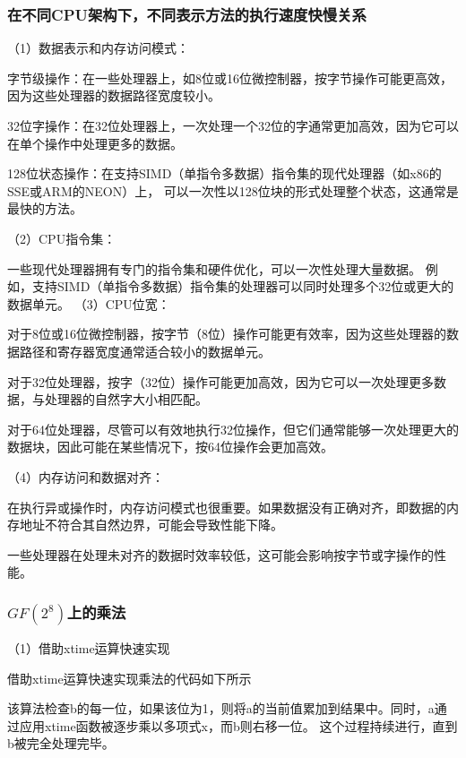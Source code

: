 \documentclass[a4paper,11pt,UTF8]{ctexart}
\begin{document}
        \subsubsection{在不同CPU架构下，不同表示方法的执行速度快慢关系}
            （1）数据表示和内存访问模式：\par
                字节级操作：在一些处理器上，如8位或16位微控制器，按字节操作可能更高效，因为这些处理器的数据路径宽度较小。\par
                32位字操作：在32位处理器上，一次处理一个32位的字通常更加高效，因为它可以在单个操作中处理更多的数据。\par
                128位状态操作：在支持SIMD（单指令多数据）指令集的现代处理器（如x86的SSE或ARM的NEON）上，
                可以一次性以128位块的形式处理整个状态，这通常是最快的方法。\par
            （2）CPU指令集：\par
                一些现代处理器拥有专门的指令集和硬件优化，可以一次性处理大量数据。
                例如，支持SIMD（单指令多数据）指令集的处理器可以同时处理多个32位或更大的数据单元。
            （3）CPU位宽：\par
                对于8位或16位微控制器，按字节（8位）操作可能更有效率，因为这些处理器的数据路径和寄存器宽度通常适合较小的数据单元。\par
                对于32位处理器，按字（32位）操作可能更加高效，因为它可以一次处理更多数据，与处理器的自然字大小相匹配。\par
                对于64位处理器，尽管可以有效地执行32位操作，但它们通常能够一次处理更大的数据块，因此可能在某些情况下，按64位操作会更加高效。\par
            （4）内存访问和数据对齐：\par
                在执行异或操作时，内存访问模式也很重要。如果数据没有正确对齐，即数据的内存地址不符合其自然边界，可能会导致性能下降。\par
                一些处理器在处理未对齐的数据时效率较低，这可能会影响按字节或字操作的性能。

        \subsubsection{$GF(2^{8} )$上的乘法}
            （1）借助xtime运算快速实现\par
                借助xtime运算快速实现乘法的代码如下所示
                
                该算法检查b的每一位，如果该位为1，则将a的当前值累加到结果中。同时，a通过应用xtime函数被逐步乘以多项式x，而b则右移一位。
                这个过程持续进行，直到b被完全处理完毕。\par
\end{document}
